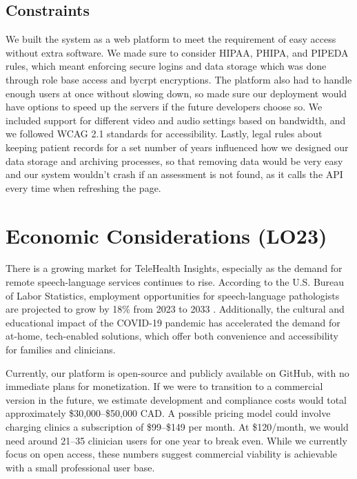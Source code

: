 \documentclass{article}
\begin{document}
\subsection{Constraints}
\hspace{2em}We built the system as a web platform to meet the requirement of easy access without extra software. We made sure 
to consider HIPAA, PHIPA, and PIPEDA rules, which meant enforcing secure logins and data storage which was done through role base access and bycrpt encryptions. 
The platform also had to handle enough users at once without slowing down, so made sure our deployment would have options to speed up the servers if the 
future developers choose so. We included support for different video and audio settings based on bandwidth, and we followed 
WCAG 2.1 standards for accessibility. Lastly, legal rules about keeping patient records for a set number of years 
influenced how we designed our data storage and archiving processes, so that removing data would be very easy and our system wouldn't crash if an assessment is not found, as it calls the API every time when refreshing the page. 

\newpage

\section{Economic Considerations (LO23)}

\hspace{2em}There is a growing market for TeleHealth Insights, especially as the demand for remote speech-language services continues to rise. 
According to the U.S. Bureau of Labor Statistics, employment opportunities for speech-language pathologists are projected to grow by 18\% 
from 2023 to 2033 \cite{slpgrowth}. Additionally, the cultural and educational impact of the COVID-19 pandemic has accelerated the demand for 
at-home, tech-enabled solutions, which offer both convenience and accessibility for families and clinicians.

Currently, our platform is open-source and publicly available on GitHub, with no immediate plans for monetization. If we were to transition 
to a commercial version in the future, we estimate development and compliance costs would total approximately \$30,000–\$50,000 CAD. A 
possible pricing model could involve charging clinics a subscription of \$99–\$149 per month. At \$120/month, we would need around 21–35 
clinician users for one year to break even. While we currently focus on open access, these numbers suggest commercial viability is achievable 
with a small professional user base.
\end{document}
